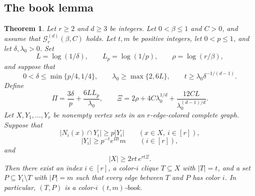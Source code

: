 \documentclass[twoside,12pt]{article}
\newtheorem{theorem}{Theorem}[section]
\theoremstyle{definition}
\theoremstyle{remark}
\newcommand{\1}{\mathbf 1}
\begin{document}
\subsection{The book lemma}\label{sec:book-theorem}

\begin{theorem}\label{thm:book}
Let $r\ge2$ and $d\ge3$ be integers. Let $0<\beta\le1$ and $C>0$, and
assume that $\mathcal G_r^{(d)}(\beta,C)$ holds. Let $t,m$ be positive
integers, let $0<p\le1$, and let $\delta,\lambda_0>0$. Set
\[
 L=\log(1/\delta),
 \qquad
 L_p=\log(1/p),
 \qquad
 \rho=\log(r/\beta),
\]
and suppose that
\[
 0<\delta\le\min\{p/4,1/4\},
 \qquad
 \lambda_0\ge\max\{2,6L\},
 \qquad
 t\ge\lambda_0\delta^{-1/(d-1)}.
\]
Define
\[
 \Pi=\frac{3\delta}{p}+\frac{6LL_p}{\lambda_0},
 \qquad
 \Xi=2\rho+4C\lambda_0^{1/d}
      +\frac{12CL}{\lambda_0^{(d-1)/d}}.
\]
Let $X,Y_1,\ldots,Y_r$ be nonempty vertex sets in an $r$-edge-colored
complete graph. Suppose that
\begin{equation}\label{eq:book-density-hyp}
 |N_i(x)\cap Y_i|\ge p|Y_i|
 \qquad(x\in X,\ i\in[r]),
\end{equation}
\begin{equation}\label{eq:book-page-hyp}
 |Y_i|\ge p^{-t}e^{\Pi t}m
 \qquad(i\in[r]),
\end{equation}
and
\begin{equation}\label{eq:book-reservoir-hyp}
 |X|\ge2rt\,e^{rt\Xi}.
\end{equation}
Then there exist an index $i\in[r]$, a color-$i$ clique $T\subseteq X$
with $|T|=t$, and a set $P\subseteq Y_i\setminus T$ with $|P|=m$ such
that every edge between $T$ and $P$ has color $i$. In particular, $(T,P)$
is a color-$i$ $(t,m)$-book.
\end{theorem}
\end{document}
